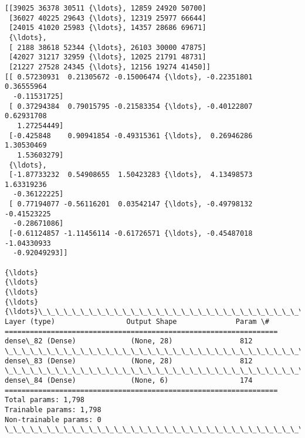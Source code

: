 \documentclass[11pt]{article}
\begin{document}
    \begin{Verbatim}[commandchars=\\\{\}]
[[39025 36378 30511 {\ldots}, 12859 24920 50700]
 [36027 40225 29643 {\ldots}, 12319 25977 66644]
 [24015 41020 25983 {\ldots}, 14357 28686 69671]
 {\ldots}, 
 [ 2188 38618 52344 {\ldots}, 26103 30000 47875]
 [42027 31217 32959 {\ldots}, 12025 21791 48731]
 [21227 27528 24345 {\ldots}, 12156 19274 41450]]
[[ 0.57230931  0.21305672 -0.15006474 {\ldots}, -0.22351801  0.36555964
  -0.11531725]
 [ 0.37294384  0.79015795 -0.21583354 {\ldots}, -0.40122807  0.62931708
   1.27254449]
 [-0.425848    0.90941854 -0.49315361 {\ldots},  0.26946286  1.30530469
   1.53603279]
 {\ldots}, 
 [-1.87733232  0.54908655  1.50423283 {\ldots},  4.13498573  1.63319236
  -0.36122225]
 [ 0.77194077 -0.56116201  0.03542147 {\ldots}, -0.49798132 -0.41523225
  -0.28671086]
 [-0.61124857 -1.11456114 -0.61726571 {\ldots}, -0.45487018 -1.04330933
  -0.92049293]]

{\ldots}
{\ldots}
{\ldots}
{\ldots}
{\ldots}\_\_\_\_\_\_\_\_\_\_\_\_\_\_\_\_\_\_\_\_\_\_\_\_\_\_\_\_\_\_\_\_\_\_\_\_\_\_\_\_\_\_\_\_\_\_\_\_\_\_\_\_\_\_\_\_\_\_\_\_\_\_\_\_\_
Layer (type)                 Output Shape              Param \#   
=================================================================
dense\_82 (Dense)             (None, 28)                812       
\_\_\_\_\_\_\_\_\_\_\_\_\_\_\_\_\_\_\_\_\_\_\_\_\_\_\_\_\_\_\_\_\_\_\_\_\_\_\_\_\_\_\_\_\_\_\_\_\_\_\_\_\_\_\_\_\_\_\_\_\_\_\_\_\_
dense\_83 (Dense)             (None, 28)                812       
\_\_\_\_\_\_\_\_\_\_\_\_\_\_\_\_\_\_\_\_\_\_\_\_\_\_\_\_\_\_\_\_\_\_\_\_\_\_\_\_\_\_\_\_\_\_\_\_\_\_\_\_\_\_\_\_\_\_\_\_\_\_\_\_\_
dense\_84 (Dense)             (None, 6)                 174       
=================================================================
Total params: 1,798
Trainable params: 1,798
Non-trainable params: 0
\_\_\_\_\_\_\_\_\_\_\_\_\_\_\_\_\_\_\_\_\_\_\_\_\_\_\_\_\_\_\_\_\_\_\_\_\_\_\_\_\_\_\_\_\_\_\_\_\_\_\_\_\_\_\_\_\_\_\_\_\_\_\_\_\_

    \end{Verbatim}

    \begin{center}
    \end{center}
    { \hspace*{\fill} \\}
    
    \begin{center}
    \end{center}
    { \hspace*{\fill} \\}
    
\end{document}
